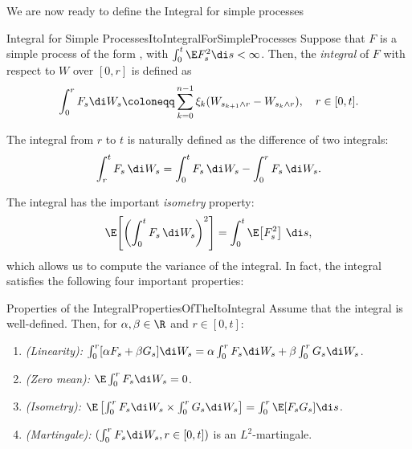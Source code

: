 We are now ready to define the \Ito{} Integral for simple processes

\begin{defn}{\Ito{} Integral for Simple Processes}{ItoIntegralForSimpleProcesses}
	Suppose that \(F\) is a simple process of the form , with \(\int_0^t \E F_s^2 \di s < \infty\). Then, the \emph{\Ito{} integral} of \(F\) with respect to \(W\) over \([0, r]\) is defined as
	\begin{equation}\label{eq:ItoIntegralSimpleDef}
		\int_0^r F_s \di W_s \coloneqq \sum_{k=0}^{n-1} \xi_k (W_{s_{k+1} \wedge r} - W_{s_k \wedge r}), \quad r \in [0, t].
	\end{equation}
\end{defn}

The \Ito{} integral from \(r\) to \(t\) is naturally defined as the difference of two integrals:
\begin{equation}
	\int_{r}^{t} F_{s} \, \di W_{s}
	= \int_{0}^{t} F_{s} \, \di W_{s} - \int_{0}^{r} F_{s} \, \di W_{s}.
\end{equation}

The \Ito{} integral has the important \textit{isometry} property:
\begin{equation}
	\E\!\left[ \left( \int_{0}^{t} F_{s} \, \di W_{s} \right)^{2} \right]
	= \int_{0}^{t} \E\!\left[ F_{s}^{2} \right] \, \di s,
\end{equation}
which allows us to compute the variance of the \Ito{} integral. In fact, the \Ito{} integral satisfies the following four important properties:

\begin{thm}{Properties of the \Ito{} Integral}{PropertiesOfTheItoIntegral}
	Assume that the \Ito{} integral is well-defined. Then, for \(\alpha, \beta \in \R\) and \(r \in [0, t]\):
	\begin{enumerate}
		\item \emph{(Linearity):} \(\int_0^r [\alpha F_s + \beta G_s] \di W_s = \alpha \int_0^r F_s \di W_s + \beta \int_0^r G_s \di W_s\).
		\item \emph{(Zero mean):} \(\E \int_0^r F_s \di W_s = 0\).
		\item \emph{(Isometry):} \(\E \left[ \int_0^r F_s \di W_s \times \int_0^r G_s \di W_s \right] = \int_0^r \E [F_s G_s] \di s\).
		\item \emph{(Martingale):} \((\int_0^r F_s \di W_s, r \in [0, t])\) is an \(L^2\)-martingale.
	\end{enumerate}
\end{thm}

